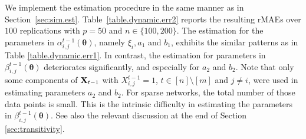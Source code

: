 \documentclass[12pt]{article}
\newcommand{\btheta}{\boldsymbol \theta}
\newcommand{\bX}{{\bf X}}
\newcommand{\0}{{\bf 0}}
\begin{document}

We implement the estimation procedure in the same manner as in Section~\ref{sec:sim.est}.
Table~\ref{table.dynamic.err2} reports the resulting rMAEs over $100$ replications with $p = 50$ and $n \in \{100,200\}$. 
The estimation for the parameters in  $\alpha_{i,j}^{t-1}(\btheta)$, namely $\xi_i, a_1$ and $b_1$, exhibits the similar patterns as in Table \ref{table.dynamic.err1}. In contrast, the estimation for parameters in $\beta_{i,j}^{t-1}(\btheta)$ deteriorates significantly,  and especially for $a_2$ and $b_2$.
Note that only some components of $\bX_{t-1}$ with $X_{i,j}^{t-1}=1$, $t\in[n]\setminus[m]$ and $j\neq i$,  were used in estimating parameters $a_2$ and $b_2$. For sparse networks, the total number of those data points is small. This is the intrinsic difficulty in estimating the parameters in $\beta_{i,j}^{t-1}(\btheta)$.
See also the relevant discussion at the end of Section \ref{sec:transitivity}.




\end{document}
